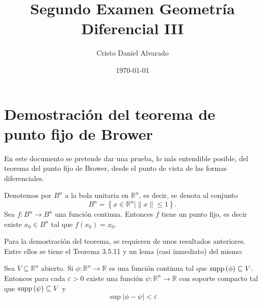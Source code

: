 \documentclass[12pt]{report}
\theoremstyle{largebreak}
\newcommand\abs[1]{\ensuremath{\lvert#1\rvert}}
\newcommand\cf[3]{\ensuremath{#1:#2\rightarrow#3}}
\newcommand\supp[1]{\ensuremath{\textup{supp}\left(#1\right)}}
\begin{document}
    \title{Segundo Examen Geometría Diferencial III}
    \author{Cristo Daniel Alvarado}
    \date{\today}
    \maketitle

    \setcounter{chapter}{1} %
        
    \section{Demostración del teorema de punto fijo de Brower}
    
En este documento se pretende dar una prueba, lo más entendible posible, del teorema del punto fijo de Brower, desde el punto de vista de las formas diferenciales. 

    \begin{theor}
        Denotemos por $B^n$ a la bola unitaria en $\mathbb{R}^n$, es decir, se denota al conjunto
        \begin{equation*}
            B^n=\left\{x\in\mathbb{R}^n|\|x\|\leq 1\right\}.
        \end{equation*}
        Sea $\cf{f}{B^n}{B^n}$ una función continua. Entonces $f$ tiene un punto fijo, es decir existe $x_0\in B^n$ tal que $f(x_0)=x_0$.    \end{theor}

Para la demostración del teorema, se requieren de unos resultados anteriores. Entre ellos se tiene el Teorema 3.5.11 y un lema (casi inmediato) del mismo:

\begin{theor}
    Sea $V\subseteq\mathbb{R}^n$ abierto. Si $\cf{\phi}{\mathbb{R}^n}{\mathbb{R}}$ es una función continua tal que $\supp{\phi}\subseteq V$. Entonces para cada $\varepsilon>0$ existe una función $\cf{\psi}{\mathbb{R}^n}{\mathbb{R}}$ con soporte compacto tal que $\supp{\psi}\subseteq V$ y
    \begin{equation*}
        \sup\abs{\phi-\psi}<\varepsilon
    \end{equation*}
\end{theor}
\end{document}
